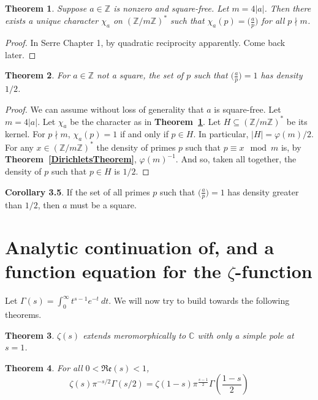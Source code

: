 \documentclass[12pt]{article}
\newcommand{\ints}{\mathbb{Z}}
\newcommand{\complex}{\mathbb{C}}
\newcommand{\intsmod}[1]{\ints / #1 \ints}
\newcommand{\tref}[1]{\textbf{Theorem~\ref{#1}}}
\newtheorem{thm}{Theorem}
\numberwithin{equation}{section}
\numberwithin{thm}{section}
\numberwithin{lemma}{section}
\numberwithin{cor}{section}
\begin{document}
\begin{thm}\label{CharacterExtensionOfLegendreSymbol}
  Suppose $a \in \ints$ is nonzero and square-free. Let $m = 4 |a|$. Then there exists a unique character $\chi_a$ on $(\intsmod{m})^*$ such that $\chi_a(p) = \big(\frac{a}{p}\big)$ for all $p \nmid m$.
\end{thm}
\begin{proof}
  In Serre Chapter 1, by quadratic reciprocity apparently. Come back later.
\end{proof}

\begin{thm}\label{PrimeSquaresHaveHalfDensity}
  For $a \in \ints$ not a square, the set of $p$ such that $\big(\frac{a}{p} \big) = 1$ has density $1/2$.
\end{thm}
\begin{proof}
  We can assume without loss of generality that $a$ is square-free. Let $m = 4 |a|$. Let $\chi_a$ be the character as in \tref{CharacterExtensionOfLegendreSymbol}. Let $H \subseteq (\intsmod{m})^*$ be its kernel. For $p \nmid m$, $\chi_a(p) = 1$ if and only if $p \in H$. In particular, $|H| = \varphi(m)/2$. For any $x \in (\intsmod{m})^*$ the density of primes $p$ such that $p \equiv x \mod m$ is, by \tref{DirichletsTheorem}, $\varphi(m)^{-1}$. And so, taken all together, the density of $p$ such that $p \in H$ is $1/2$.
\end{proof}

\textbf{Corollary 3.5}. If the set of all primes $p$ such that $\big( \frac{a}{p} \big) = 1$ has density greater than $1/2$, then $a$ must be a square.

\section{Analytic continuation of, and a function equation for the $\zeta$-function}

Let $\Gamma(s) = \int_0^{\infty} t^{s-1} e^{-t} \ dt$. We will now try to build towards the following theorems.

\begin{thm}\label{ZetaIsMeromorphic}
  $\zeta(s)$ extends meromorphically to $\complex$ with only a simple pole at $s = 1$.
\end{thm}

\begin{thm}\label{ZetaFunctionalEquation}
  For all $0 < \mathfrak{Re}(s) < 1$, \begin{equation*}
    \zeta(s) \pi^{-s/2} \Gamma(s/2) = \zeta(1 - s) \pi^{\frac{s-1}{2}}\Gamma \left( \frac{1-s}{2} \right)
  \end{equation*}
\end{thm}
\end{document}

